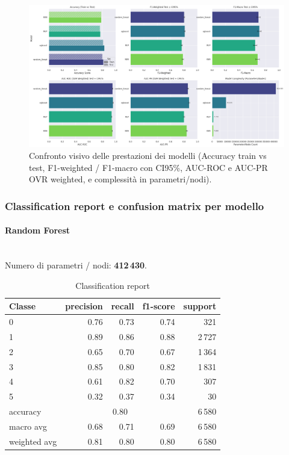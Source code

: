\documentclass[a4paper,12pt]{report}
\begin{document}
	\begin{figure}[H]
		\centering
		\includegraphics[width=1.0\textwidth]{img/comparison_pm.png}
		\caption{Confronto visivo delle prestazioni dei modelli (Accuracy train vs test, F1-weighted / F1-macro con CI95\%, AUC-ROC e AUC-PR OVR weighted, e complessità in parametri/nodi).}
		\label{fig:comparison_pm}
	\end{figure}
	
	\subsubsection{Classification report e confusion matrix per modello}
	
	\paragraph{Random Forest} \mbox{}\\
	Numero di parametri / nodi: \textbf{412\,430}.
	
	\begin{table}[H]
		\centering
		\caption{Classification report}
		\label{tab:cr_rf}
		\begin{tabular}{lrrrr}
			\toprule
			Classe & precision & recall & f1-score & support \\
			\midrule
			0 & 0.76 & 0.73 & 0.74 & 321 \\
			1 & 0.89 & 0.86 & 0.88 & 2\,727 \\
			2 & 0.65 & 0.70 & 0.67 & 1\,364 \\
			3 & 0.85 & 0.80 & 0.82 & 1\,831 \\
			4 & 0.61 & 0.82 & 0.70 & 307 \\
			5 & 0.32 & 0.37 & 0.34 & 30 \\
			\midrule
			accuracy & \multicolumn{3}{c}{0.80} & 6\,580 \\
			macro avg & 0.68 & 0.71 & 0.69 & 6\,580 \\
			weighted avg & 0.81 & 0.80 & 0.80 & 6\,580 \\
			\bottomrule
		\end{tabular}
	\end{table}
	
\end{document}
